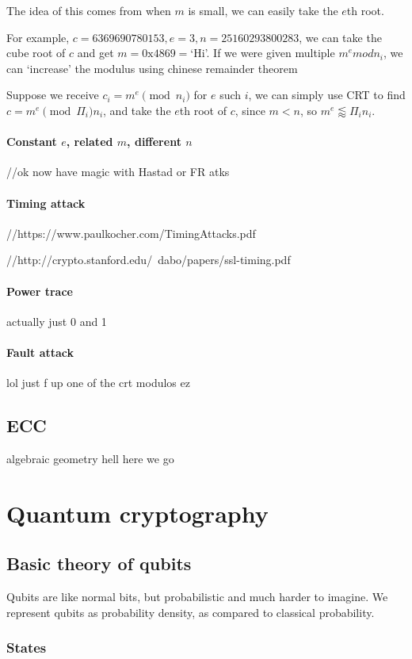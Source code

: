 \documentclass{report}
\begin{document}
The idea of this comes from when $m$ is small, we can easily take the $e$th root.

For example, $c=6369690780153,e=3,n=25160293800283$, we can take the cube root of $c$ and get $m=0\text{x}4869=$`Hi'. If we were given multiple $m^e mod n_i$, we can `increase' the modulus using chinese remainder theorem

Suppose we receive $c_i=m^e\pmod n_i$ for $e$ such $i$, we can simply use CRT to find $c=m^e\pmod \Pi_i n_i$, and take the $e$th root of $c$, since $m<n$, so $m^e\lessapprox\Pi_in_i$.

\subsection{Constant $e$, related $m$, different $n$}
//ok now have magic with Hastad or FR atks
\subsection{Timing attack}
//https://www.paulkocher.com/TimingAttacks.pdf

//http://crypto.stanford.edu/~dabo/papers/ssl-timing.pdf
\subsection{Power trace}
actually just 0 and 1
\subsection{Fault attack}
lol just f up one of the crt modulos ez
\chapter{ECC}
algebraic geometry hell here we go
\part{Quantum cryptography}
\chapter{Basic theory of qubits}
Qubits are like normal bits, but probabilistic and much harder to imagine. We represent qubits as probability density, as compared to classical probability.

\section{States}
\end{document}
